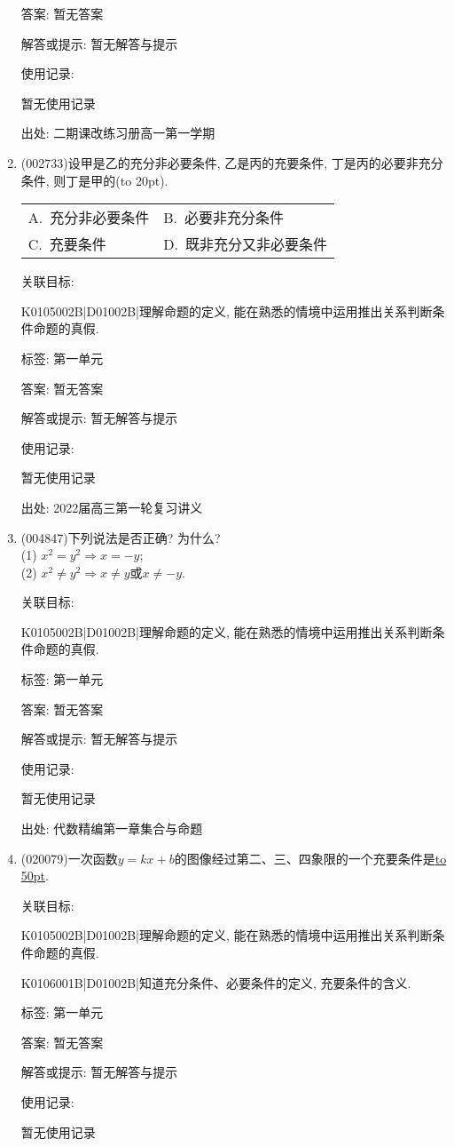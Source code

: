 \documentclass[10pt,a4paper]{article}
\newcommand{\blank}[1]{\underline{\hbox to #1pt{}}}
\newcommand{\bracket}[1]{(\hbox to #1pt{})}
\newcommand{\twoch}[4]{\par\begin{tabular}{p{.46\textwidth}p{.46\textwidth}}
A.~#1& B.~#2\\
C.~#3& D.~#4
\end{tabular}}
\begin{document}
\begin{enumerate}[1.]
答案: 暂无答案

解答或提示: 暂无解答与提示

使用记录:

暂无使用记录


出处: 二期课改练习册高一第一学期
\item { (002733)}设甲是乙的充分非必要条件, 乙是丙的充要条件, 丁是丙的必要非充分条件, 则丁是甲的\bracket{20}.
\twoch{充分非必要条件}{必要非充分条件}{充要条件}{既非充分又非必要条件}


关联目标:

K0105002B|D01002B|理解命题的定义, 能在熟悉的情境中运用推出关系判断条件命题的真假.



标签: 第一单元

答案: 暂无答案

解答或提示: 暂无解答与提示

使用记录:

暂无使用记录


出处: 2022届高三第一轮复习讲义
\item { (004847)}下列说法是否正确? 为什么?\\
(1) $x^2=y^2\Rightarrow x=-y$;\\
(2) $x^2\ne y^2\Rightarrow x\ne y$或$x\ne -y$.


关联目标:

K0105002B|D01002B|理解命题的定义, 能在熟悉的情境中运用推出关系判断条件命题的真假.



标签: 第一单元

答案: 暂无答案

解答或提示: 暂无解答与提示

使用记录:

暂无使用记录


出处: 代数精编第一章集合与命题
\item { (020079)}一次函数$y=kx+b$的图像经过第二、三、四象限的一个充要条件是\blank{50}.


关联目标:

K0105002B|D01002B|理解命题的定义, 能在熟悉的情境中运用推出关系判断条件命题的真假.

K0106001B|D01002B|知道充分条件、必要条件的定义, 充要条件的含义.



标签: 第一单元

答案: 暂无答案

解答或提示: 暂无解答与提示

使用记录:

暂无使用记录



\end{enumerate}
\end{document}
